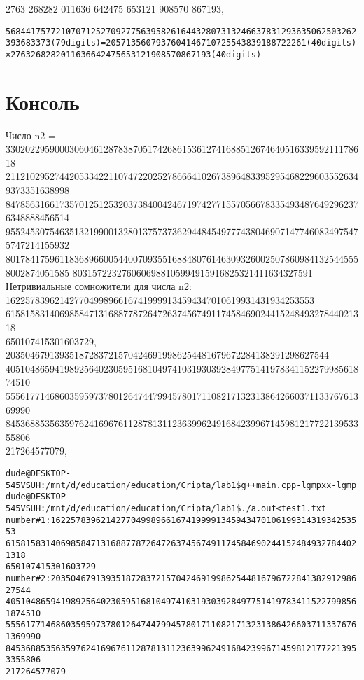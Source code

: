 2763 268282 011636 642475 653121 908570 867193,\\
\begin{alltt}
5 684417 577210 707125 270927 756395 826164 432807 313246 637831 293635 062503 262393 683373 (79 digits) = 2057 135607 937604 146710 725543 839188 722261 (40 digits) × 2763 268282 011636 642475 653121 908570 867193 (40 digits)

\end{alltt}



\section{Консоль}

Число n2 = 33020229590003060461287838705174268615361274168851267464051633959211178618
2112102952744205334221107472202527866641026738964833952954682296035526349373351638998
8478563166173570125125320373840042467197427715570566783354934876492962376348888456514
9552453075463513219900132801375737362944845497774380469071477460824975475747214155932
8017841759611836896600544007093551688480761463093260025078609841325445558002874051585
8031572232760606988105994915916825321411634327591\\

Нетривиальные сомножители для числа n2:\\
162257839621427704998966167419999134594347010619931431934253553\\
61581583140698584713168877872647263745674911745846902441524849327844021318\\
650107415301603729,\\

203504679139351872837215704246919986254481679672284138291298627544\\
40510486594198925640230595168104974103193039284977514197834115227998561874510\\
55561771468603595973780126474479945780171108217132313864266037113376761369990\\
84536885356359762416967611287813112363996249168423996714598121772213953355806\\
217264577079,\\

\begin{alltt}
dude@DESKTOP-545VSUH:/mnt/d/education/education/Cripta/lab1\$ g++ main.cpp -lgmpxx -lgmp
dude@DESKTOP-545VSUH:/mnt/d/education/education/Cripta/lab1\$ ./a.out <test1.txt
number \#1: 162257839621427704998966167419999134594347010619931431934253553
61581583140698584713168877872647263745674911745846902441524849327844021318
650107415301603729
number \#2: 203504679139351872837215704246919986254481679672284138291298627544
40510486594198925640230595168104974103193039284977514197834115227998561874510
55561771468603595973780126474479945780171108217132313864266037113376761369990
84536885356359762416967611287813112363996249168423996714598121772213953355806
217264577079

\end{alltt}

\pagebreak